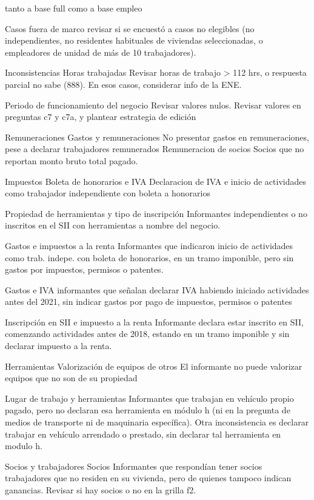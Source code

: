 \documentclass[
]{article}
\begin{document}
tanto a base full como a base empleo

Casos fuera de marco revisar si se encuestó a casos no elegibles (no independientes, no residentes habituales de viviendas seleccionadas, o empleadores de unidad de más de 10 trabajadores).

Inconsistencias Horas trabajadas Revisar horas de trabajo \textgreater{} 112 hrs, o respuesta parcial no sabe (888). En esos casos, considerar info de la ENE.

Periodo de funcionamiento del negocio Revisar valores nulos. Revisar valores en preguntas c7 y c7a, y plantear estrategia de edición

Remuneraciones Gastos y remuneraciones No presentar gastos en remuneraciones, pese a declarar trabajadores remunerados Remuneracion de socios Socios que no reportan monto bruto total pagado.

Impuestos Boleta de honorarios e IVA Declaracion de IVA e inicio de actividades como trabajador independiente con boleta a honorarios

Propiedad de herramientas y tipo de inscripción Informantes independientes o no inscritos en el SII con herramientas a nombre del negocio.

Gastos e impuestos a la renta Informantes que indicaron inicio de actividades como trab. indepe. con boleta de honorarios, en un tramo imponible, pero sin gastos por impuestos, permisos o patentes.

Gastos e IVA informantes que señalan declarar IVA habiendo iniciado actividades antes del 2021, sin indicar gastos por pago de impuestos, permisos o patentes

Inscripción en SII e impuesto a la renta Informante declara estar inscrito en SII, comenzando actividades antes de 2018, estando en un tramo imponible y sin declarar impuesto a la renta.

Herramientas Valorización de equipos de otros El informante no puede valorizar equipos que no son de su propiedad

Lugar de trabajo y herramientas Informantes que trabajan en vehículo propio pagado, pero no declaran esa herramienta en módulo h (ni en la pregunta de medios de transporte ni de maquinaria específica). Otra inconsistencia es declarar trabajar en vehículo arrendado o prestado, sin declarar tal herramienta en modulo h.

Socios y trabajadores Socios Informantes que respondían tener socios trabajadores que no residen en su vivienda, pero de quienes tampoco indican ganancias. Revisar si hay socios o no en la grilla f2.
\end{document}
